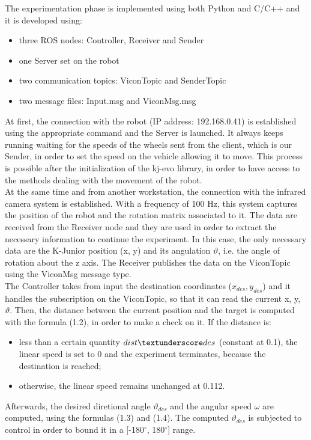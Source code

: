 \documentclass[a4paper,11pt,oneside]{book}
\begin{document}
The experimentation phase is implemented using both Python and C/C++ and it is developed using:
\begin{itemize}
\item three ROS nodes: Controller, Receiver and Sender
\item one Server set on the robot
\item two communication topics: ViconTopic and SenderTopic
\item two message files: Input.msg and ViconMsg.msg
\end{itemize}
At first, the connection with the robot (IP address: 192.168.0.41) is established using the appropriate command and the Server is launched. It always keeps running waiting for the speeds of the wheels sent from the client, which is our Sender, in order to set the speed on the vehicle allowing it to move. This process is possible after the initialization of the kj-evo library, in order to have access to the methods dealing with the movement of the robot.
\\
At the same time and from another workstation, the connection with the infrared camera system is established. With a frequency of 100 Hz, this system captures the position of the robot and the rotation matrix associated to it. The data are received from the Receiver node and they are used in order to extract the necessary information to continue the experiment. In this case, the only necessary data are the K-Junior position (x, y) and its angulation $\vartheta$, i.e. the angle of rotation about the z axis. The Receiver publishes the data on the ViconTopic using the ViconMsg message type.
\\
The Controller takes from input the destination coordinates ($x_{des}, y_{des}$) and it handles the subscription on the ViconTopic, so that it can read the current x, y, $\vartheta$. Then, the distance between the current position and the target is computed with the formula (1.2), in order to make a check on it. If the distance is:
\begin{itemize}
\item less than a certain quantity $dist\textunderscore des$ (constant at 0.1), the linear speed is set to 0 and the experiment terminates, because the destination is reached;
\item otherwise, the linear speed remains unchanged at 0.112.
\end{itemize}
Afterwards, the desired diretional angle $\vartheta_{des}$ and the angular speed $\omega$ are computed, using the formulas (1.3) and (1.4). The computed  $\vartheta_{des}$ is subjected to control in order to bound it in a [-180$^{\circ}$, 180$^{\circ}$] range.
\end{document}
